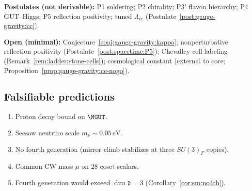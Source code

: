 \textbf{Postulates (not derivable):} P1 soldering; P2 chirality;
P3$'$ flavon hierarchy; P4 GUT--Higgs; P5 reflection positivity; tuned
$\Lambda_{\mathrm{cc}}$ (Postulate~\ref{post:gauge-gravity:cc}).

\textbf{Open (minimal):} Conjecture~\ref{conj:gauge-gravity:kappa};
nonperturbative reflection positivity (Postulate~\ref{post:spacetime:P5});
Chevalley cell labeling (Remark~\ref{rem:ladder:stone-cells});
cosmological constant (external to core;
Proposition~\ref{prop:gauge-gravity:cc-nogo}).

\subsection{Falsifiable predictions}
\label{sec:verification:predictions}

\begin{enumerate}[label=\textbf{F\arabic*.},leftmargin=*]
  \item Proton decay bound on $\MGUT$.
  \item Seesaw neutrino scale $m_\nu\sim0.05\,\mathrm{eV}$.
  \item No fourth generation (mirror climb stabilizes at three $SU(3)_F$ copies).
  \item Common CW mass $\mu$ on $28$ coset scalars.
  \item Fourth generation would exceed $\dim\mathfrak{d}=3$
    (Corollary~\ref{cor:sm:no4th}).
\end{enumerate}